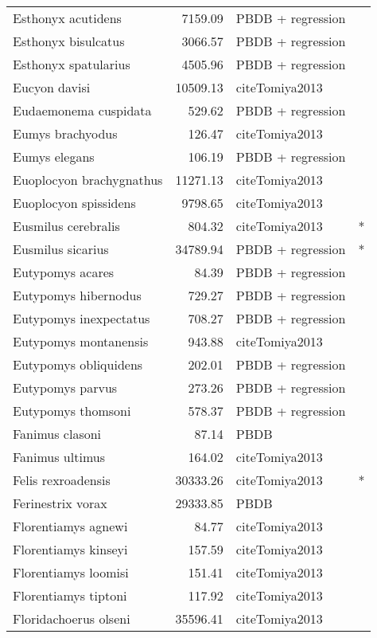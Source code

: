 \begin{table}[ht]
\begin{tabular}{lrll}
  Esthonyx acutidens & 7159.09 & PBDB + regression &  \\ 
  Esthonyx bisulcatus & 3066.57 & PBDB + regression &  \\ 
  Esthonyx spatularius & 4505.96 & PBDB + regression &  \\ 
  Eucyon davisi & 10509.13 & cite{Tomiya2013} &  \\ 
  Eudaemonema cuspidata & 529.62 & PBDB + regression &  \\ 
  Eumys brachyodus & 126.47 & cite{Tomiya2013} &  \\ 
  Eumys elegans & 106.19 & PBDB + regression &  \\ 
  Euoplocyon brachygnathus & 11271.13 & cite{Tomiya2013} &  \\ 
  Euoplocyon spissidens & 9798.65 & cite{Tomiya2013} &  \\ 
  Eusmilus cerebralis & 804.32 & cite{Tomiya2013} & * \\ 
  Eusmilus sicarius & 34789.94 & PBDB + regression & * \\ 
  Eutypomys acares & 84.39 & PBDB + regression &  \\ 
  Eutypomys hibernodus & 729.27 & PBDB + regression &  \\ 
  Eutypomys inexpectatus & 708.27 & PBDB + regression &  \\ 
  Eutypomys montanensis & 943.88 & cite{Tomiya2013} &  \\ 
  Eutypomys obliquidens & 202.01 & PBDB + regression &  \\ 
  Eutypomys parvus & 273.26 & PBDB + regression &  \\ 
  Eutypomys thomsoni & 578.37 & PBDB + regression &  \\ 
  Fanimus clasoni & 87.14 & PBDB &  \\ 
  Fanimus ultimus & 164.02 & cite{Tomiya2013} &  \\ 
  Felis rexroadensis & 30333.26 & cite{Tomiya2013} & * \\ 
  Ferinestrix vorax & 29333.85 & PBDB &  \\ 
  Florentiamys agnewi & 84.77 & cite{Tomiya2013} &  \\ 
  Florentiamys kinseyi & 157.59 & cite{Tomiya2013} &  \\ 
  Florentiamys loomisi & 151.41 & cite{Tomiya2013} &  \\ 
  Florentiamys tiptoni & 117.92 & cite{Tomiya2013} &  \\ 
  Floridachoerus olseni & 35596.41 & cite{Tomiya2013} &  \\ 

\end{tabular}
\end{table}

